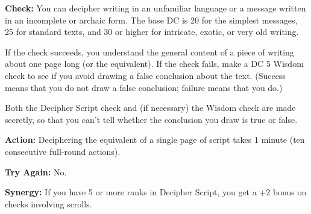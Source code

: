 
\textbf{Check:} You can decipher writing in an unfamiliar language or a message written in an incomplete or archaic form. The base DC is 20 for the simplest messages, 25 for standard texts, and 30 or higher for intricate, exotic, or very old writing.

If the check succeeds, you understand the general content of a piece of writing about one page long (or the equivalent). If the check fails, make a DC 5 Wisdom check to see if you avoid drawing a false conclusion about the text. (Success means that you do not draw a false conclusion; failure means that you do.)

Both the Decipher Script check and (if necessary) the Wisdom check are made secretly, so that you can't tell whether the conclusion you draw is true or false.

\textbf{Action:} Deciphering the equivalent of a single page of script takes 1 minute (ten consecutive full-round actions).

\textbf{Try Again:} No.

\textbf{Synergy:} If you have 5 or more ranks in Decipher Script, you get a +2 bonus on  checks involving scrolls.
